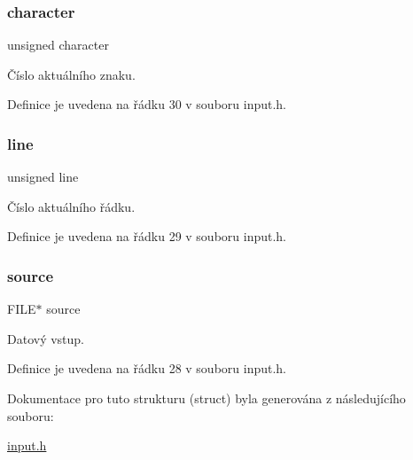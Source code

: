 \subsubsection{\texorpdfstring{character}{character}}
{\footnotesize\ttfamily unsigned character}



Číslo aktuálního znaku. 



Definice je uvedena na řádku 30 v souboru input.\+h.

\mbox{\label{struct_s___input_a05ef0c4dbeec4fc8ccb225de9c26d896}} 
\subsubsection{\texorpdfstring{line}{line}}
{\footnotesize\ttfamily unsigned line}



Číslo aktuálního řádku. 



Definice je uvedena na řádku 29 v souboru input.\+h.

\mbox{\label{struct_s___input_a0c4aa150664a3347db13aeeb47811829}} 
\subsubsection{\texorpdfstring{source}{source}}
{\footnotesize\ttfamily F\+I\+LE$\ast$ source}



Datový vstup. 



Definice je uvedena na řádku 28 v souboru input.\+h.



Dokumentace pro tuto strukturu (struct) byla generována z následujícího souboru\+:\begin{DoxyCompactItemize}
\item 
\hyperlink{input_8h}{input.\+h}\end{DoxyCompactItemize}
